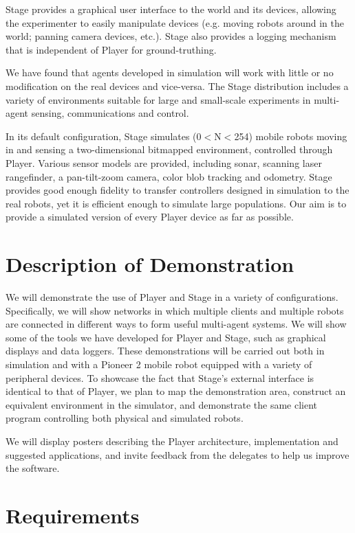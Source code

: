 \documentclass[10pt]{article}
\begin{document}
Stage provides a graphical user interface to the world and its
devices, allowing the experimenter to easily manipulate devices (e.g.
moving robots around in the world; panning camera devices, etc.).
Stage also provides a logging mechanism that is independent of Player
for ground-truthing.

We have found that agents developed in simulation will work with
little or no modification on the real devices and vice-versa. The
Stage distribution includes a variety of environments suitable for
large and small-scale experiments in multi-agent sensing,
communications and control.

In its default configuration, Stage simulates (0$<$N$<$254) mobile
robots moving in and sensing a two-dimensional bitmapped environment,
controlled through Player.  Various sensor models are provided,
including sonar, scanning laser rangefinder, a pan-tilt-zoom camera,
color blob tracking and odometry.  Stage provides good enough fidelity
to transfer controllers designed in simulation to the real robots, yet
it is efficient enough to simulate large populations. Our aim is to
provide a simulated version of every Player device as far as possible.


\section*{Description of Demonstration}
We will demonstrate the use of Player and Stage in a variety of
configurations.  Specifically, we will show networks in which multiple
clients and multiple robots are connected in different ways to form
useful multi-agent systems.  We will show some of the tools we have
developed for Player and Stage, such as graphical displays and data
loggers.  These demonstrations will be carried out both in simulation
and with a Pioneer 2 mobile robot equipped with a variety of
peripheral devices.  To showcase the fact that Stage's external
interface is identical to that of Player, we plan to map the
demonstration area, construct an equivalent environment in the
simulator, and demonstrate the same client program controlling both
physical and simulated robots.

We will display posters describing the Player architecture,
implementation and suggested applications, and invite feedback from
the delegates to help us improve the software. 

\section*{Requirements}
\end{document}
